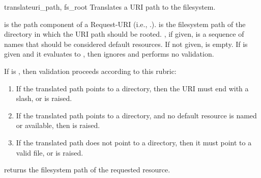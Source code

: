 \begin{funcdesc}{translate}{uri_path, fs_root}
Translates a URI path to the filesystem.

 is the path component of a Request-URI (i.e.,
.).  is the filesystem path of the
directory in which the URI path should be rooted. , if given, is a
sequence of names that should be considered default resources. If not given,
 is empty. If  is given and it evaluates to ,
then  ignores  and performs no validation.

If  is , then validation proceeds according to this
rubric:

\begin{enumerate}

\item If the translated path points to a directory, then the URI must end with a
slash, or
 is
raised.

\item If the translated path points to a directory, and no default resource is
named or available, then
 is
raised.

\item If the translated path does not point to a directory, then it must point
to a valid file, or
 is
raised.

\end{enumerate}

 returns the filesystem path of the requested resource.
\end{funcdesc}
